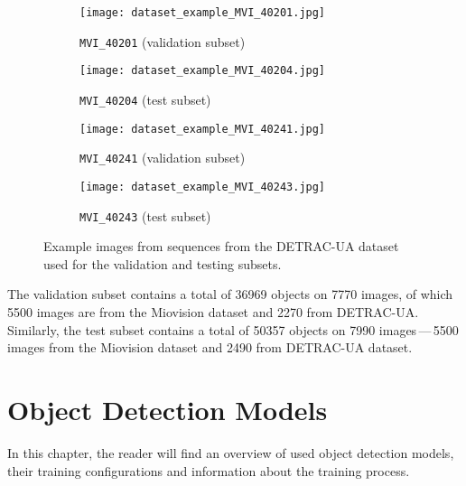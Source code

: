 \begin{figure}[t]
    \centering
    \begin{subfigure}[b]{0.495\textwidth}
        \texttt{[image: dataset\_example\_MVI\_40201.jpg]}
        \caption{\texttt{MVI\_40201} (validation subset)}
    \end{subfigure}
    \begin{subfigure}[b]{0.495\textwidth}
        \texttt{[image: dataset\_example\_MVI\_40204.jpg]}
        \caption{\texttt{MVI\_40204} (test subset)}
    \end{subfigure}
    \begin{subfigure}[b]{0.495\textwidth}
        \texttt{[image: dataset\_example\_MVI\_40241.jpg]}
        \caption{\texttt{MVI\_40241} (validation subset)}
    \end{subfigure}
    \begin{subfigure}[b]{0.495\textwidth}
        \texttt{[image: dataset\_example\_MVI\_40243.jpg]}
        \caption{\texttt{MVI\_40243} (test subset)}
    \end{subfigure}
    \caption{Example images from sequences from the DETRAC-UA dataset used for
    the validation and testing subsets.}
    \label{TestValExamples}
\end{figure}

The validation subset contains a total of \num{36969} objects on \num{7770}
images, of which \num{5500} images are from the Miovision dataset and \num{2270}
from DETRAC-UA. Similarly, the test subset contains a total of \num{50357}
objects on \num{7990} images\,---\,\num{5500} images from the Miovision dataset and
\num{2490} from DETRAC-UA dataset.




\chapter{Object Detection Models}
\label{ModelsChapter}





In this chapter, the reader will find an overview of used object detection
models, their training configurations and information about the training
process.


